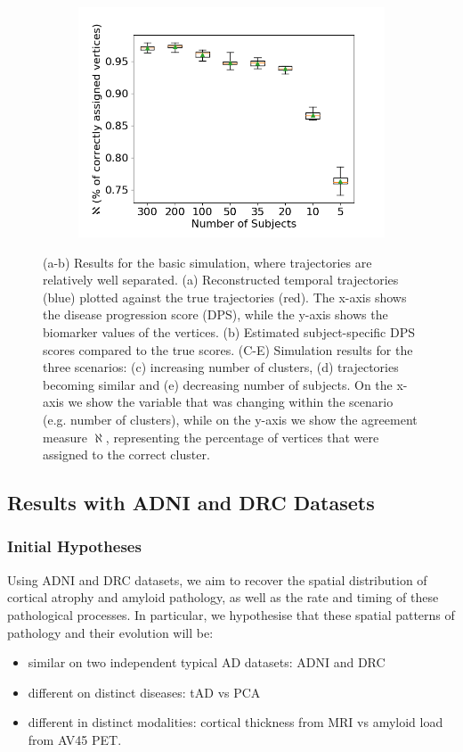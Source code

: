 \begin{figure}
\begin{subfigure}[b]{0.32\textwidth}
\includegraphics[width=1\textwidth]{images/correctVertices_nrSubj.png}
\caption{}
\label{diveResSynthE}
\end{subfigure}
\caption[DIVE Simulation Results]{(a-b) Results for the basic simulation, where trajectories are relatively well separated. (a) Reconstructed temporal trajectories (blue) plotted against the true trajectories (red). The x-axis shows the disease progression score (DPS), while the y-axis shows the biomarker values of the vertices. (b) Estimated subject-specific DPS scores compared to the true scores. (C-E) Simulation results for the three scenarios: (c) increasing number of clusters, (d) trajectories becoming similar and (e) decreasing number of subjects. On the x-axis we show the variable that was changing within the scenario (e.g. number of clusters), while on the y-axis we show the agreement measure $\aleph$, representing the percentage of vertices that were assigned to the correct cluster.}
\label{diveResSynth}
\end{figure}


\subsection{Results with ADNI and DRC Datasets}
\label{sec:diveResAdniDrc}

\subsubsection{Initial Hypotheses}

Using ADNI and DRC datasets, we aim to recover the spatial distribution of cortical atrophy and amyloid pathology, as well as the rate and timing of these pathological processes. In particular, we hypothesise that these spatial patterns of pathology and their evolution will be: 
\begin{itemize}
 \item similar on two independent typical AD datasets: ADNI and DRC
 \item different on distinct diseases: tAD vs PCA 
 \item different in distinct modalities: cortical thickness from MRI vs amyloid load from AV45 PET.
\end{itemize}

